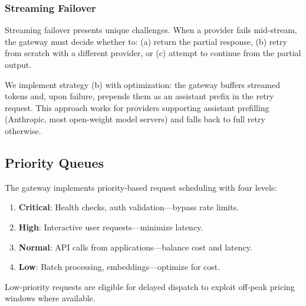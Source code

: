 \subsubsection{Streaming Failover}

Streaming failover presents unique challenges. When a provider fails mid-stream, the gateway must decide whether to: (a) return the partial response, (b) retry from scratch with a different provider, or (c) attempt to continue from the partial output.

We implement strategy (b) with optimization: the gateway buffers streamed tokens and, upon failure, prepends them as an assistant prefix in the retry request. This approach works for providers supporting assistant prefilling (Anthropic, most open-weight model servers) and falls back to full retry otherwise.

\subsection{Priority Queues}

The gateway implements priority-based request scheduling with four levels:

\begin{enumerate}[leftmargin=*]
    \item \textbf{Critical}: Health checks, auth validation---bypass rate limits.
    \item \textbf{High}: Interactive user requests---minimize latency.
    \item \textbf{Normal}: API calls from applications---balance cost and latency.
    \item \textbf{Low}: Batch processing, embeddings---optimize for cost.
\end{enumerate}

Low-priority requests are eligible for delayed dispatch to exploit off-peak pricing windows where available.

